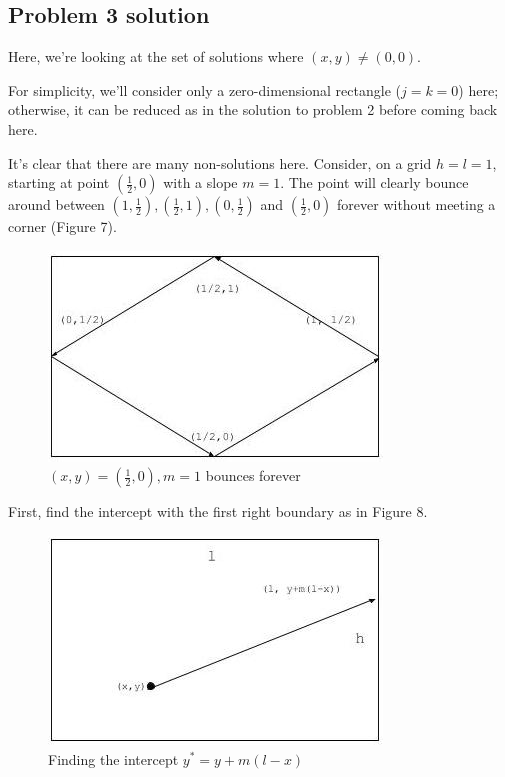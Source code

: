 \documentclass[11pt, oneside]{article} 	%
\begin{document}
\subsection{Problem 3 solution}

Here, we're looking at the set of solutions where $(x, y) \neq (0, 0)$.

For simplicity, we'll consider only a zero-dimensional rectangle ($j = k = 0$) here; otherwise, it can be reduced as in the solution to problem 2 before coming back here.

It's clear that there are many non-solutions here. Consider, on a grid $h = l = 1$, starting at point $(\frac{1}{2}, 0)$ with a slope $m = 1$. The point will clearly bounce around between $(1, \frac{1}{2}), (\frac{1}{2}, 1), (0, \frac{1}{2})$ and $ (\frac{1}{2}, 0)$ forever without meeting a corner (Figure 7).

\begin{figure}[!htb]
\centering
\includegraphics[scale=.4]{bounceforever}
\caption{$(x, y) = (\frac{1}{2}, 0), m = 1$ bounces forever}
\end{figure}

First, find the intercept with the first right boundary as in Figure 8.

\begin{figure}[!htb]
\centering
\includegraphics[scale=.4]{intercept}
\caption{Finding the intercept $y^* = y + m(l-x)$}
\end{figure}
\end{document}
